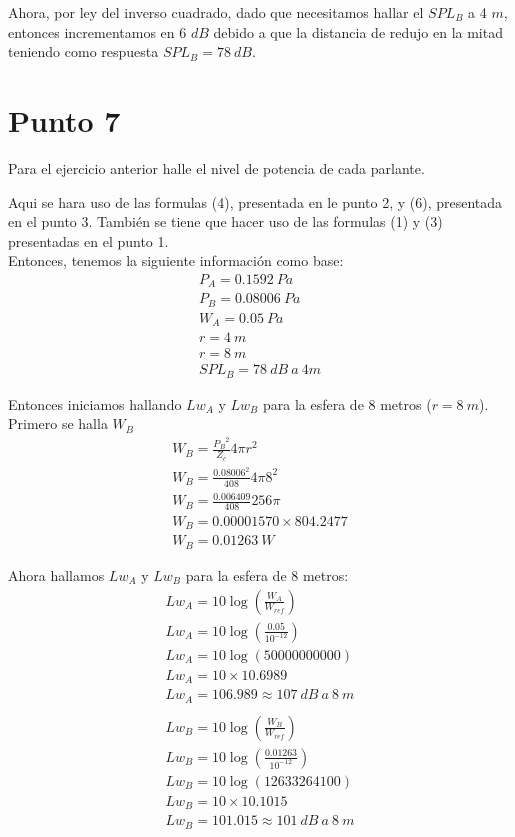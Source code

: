 \documentclass{article}
\begin{document}
Ahora, por ley del inverso cuadrado, dado que necesitamos hallar el $SPL_B$ a 4 $m$, entonces incrementamos en 6 $dB$ debido a que la distancia de redujo en la mitad teniendo como respuesta $SPL_B = 78\ dB$.

\section{Punto 7}

Para el ejercicio anterior halle el nivel de potencia de cada parlante.

Aqui se hara uso de las formulas (4), presentada en le punto 2, y (6), presentada en el punto 3. También se tiene que hacer uso de las formulas (1) y (3) presentadas en el punto 1.\\

Entonces, tenemos la siguiente información como base:
\begin{gather*}
    P_A = 0.1592\ Pa\\
    P_B = 0.08006\ Pa\\
    W_A = 0.05\ Pa\\
    r = 4\ m\\
    r = 8\ m\\
    SPL_B = 78\ dB\ a\ 4m
\end{gather*}

Entonces iniciamos hallando $Lw_A$ y $Lw_B$ para la esfera de 8 metros ($r = 8\ m$). Primero se halla $W_B$
\begin{gather*}
    W_B = \frac{{P_B}^2}{Z_c} 4\pi r^2\\
    W_B = \frac{0.08006^2}{408} 4\pi 8^2\\
    W_B = \frac{0.006409}{408} 256\pi\\
    W_B = 0.00001570 \times 804.2477\\
    W_B = 0.01263\ W
\end{gather*}
    
Ahora hallamos $Lw_A$ y $Lw_B$ para la esfera de 8 metros:
\begin{gather*}
    Lw_A = 10 \log(\frac{W_A}{W_{ref}})\\
    Lw_A = 10 \log(\frac{0.05}{10^{-12}})\\
    Lw_A = 10 \log(50000000000)\\
    Lw_A = 10 \times 10.6989\\
    Lw_A = 106.989 \approx 107\ dB\ a\ 8\ m\\\\
    Lw_B = 10 \log(\frac{W_B}{W_{ref}})\\
    Lw_B = 10 \log(\frac{0.01263}{10^{-12}})\\
    Lw_B = 10 \log(12633264100)\\
    Lw_B = 10 \times 10.1015\\
    Lw_B = 101.015 \approx 101\ dB\ a\ 8\ m\\
\end{gather*}
\end{document}

